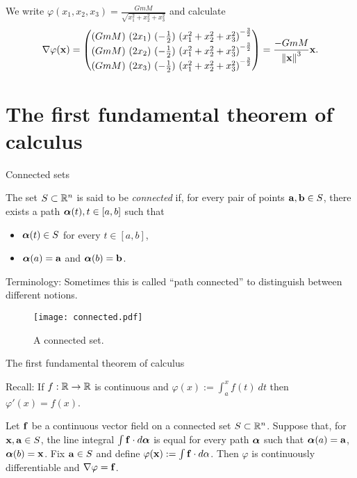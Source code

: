 We write \(\varphi(x_1,x_2,x_3) = \frac{GmM}{\sqrt{x_1^2 + x_2^2 + x_3^2}}\)
and calculate
\[
    \nabla \varphi(\xx) =
    \begin{pmatrix}
        {(GmM) \ (2x_1)} \ {(-\frac{1}{2}) \ {(x_1^2 + x_2^2 + x_3^2)}^{-\frac{3}{2}}} \\
        {(GmM) \ (2x_2)} \ {(-\frac{1}{2}) \ {(x_1^2 + x_2^2 + x_3^2)}^{-\frac{3}{2}}} \\
        {(GmM) \ (2x_3)} \ {(-\frac{1}{2}) \ {(x_1^2 + x_2^2 + x_3^2)}^{-\frac{3}{2}}}
    \end{pmatrix}
    =   \frac{-GmM}{\norm{\xx}^3}\xx.
\]




\section{The first fundamental theorem of calculus}


 {Connected sets}




\begin{definition}[connected]
    The set \(S\subset \bR^n\) is said to be \emph{connected} if, for every pair of points \(\aa,\bb\in S\), there exists a path \(\aalpha(t), t\in[a,b]\) such that
    \begin{itemize}
        \item \(\aalpha(t)\in S\) for every \( t\in[a,b]\),
        \item \(\aalpha(a)=\aa\) and \(\aalpha(b)=\bb\).
    \end{itemize}
\end{definition}

{Terminology:} Sometimes this is called ``path connected'' to distinguish between different notions.


\begin{figure}[htbp]
    \begin{center}
        \texttt{[image: connected.pdf]}
        \caption{A connected set.}%
        \label{fig:connected}      
    \end{center}
\end{figure}

{The first fundamental theorem of calculus}

{Recall:}
If \(f:\bR \to \bR\) is continuous and \(\varphi(x) := \int_a^x f(t) \ dt\) then \(\varphi'(x) = f(x)\).

\begin{theorem}
    Let \(\ff\) be a continuous vector field on a connected set \(S \subset \bR^n\).
    Suppose that, for \(\xx,\aa\in S\), the line integral \(\int \ff \cdot d\aalpha\) is equal for every path \(\aalpha\) such that \(\aalpha(a)=\aa\), \(\aalpha(b)=\xx\).
    Fix \(\aa\in S\) and define \(\varphi(\xx):= \int \ff \cdot d\alpha\).
    Then \(\varphi\) is continuously differentiable and \(\nabla \varphi = \ff\).
\end{theorem}

